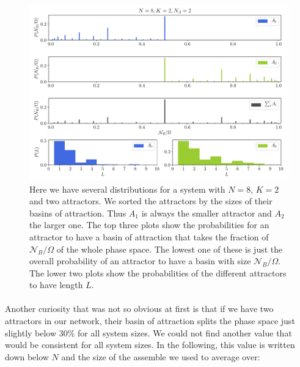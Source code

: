 \paragraph*{}
\begin{figure}[t]
	\includegraphics[width=\textwidth]{Plots/Basin_Hists_N8_2}
	\caption{Here we have several distributions for a system with $N=8$, $K=2$ and two attractors. We sorted the attractors by the sizes of their basins of attraction. Thus $A_1$ is always the smaller attractor and $A_2$ the larger one. The top three plots show the probabilities for an attractor to have a basin of attraction that takes the fraction of $\mathcal{N}_B/\Omega$ of the whole phase space. The lowest one of these is just the overall probability of an attractor to have a basin with size $\mathcal{N}_B/\Omega$. The lower two plots show the probabilities of the different attractors to have length $L$.}
	\label{fig:basin_hists}
\end{figure}

\paragraph*{}
Another curiosity that was not so obvious at first is that if we have two attractors in our network, their basin of attraction splits the phase space just slightly below $ 30\% $ for all system sizes. We could not find another value that would be consistent for all system sizes. In the following, this value is written down below $ N $ and the size of the assemble we used to average over:
